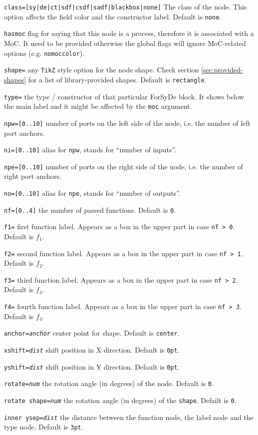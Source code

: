 \begin{optionslist}
\item \texttt{class=[sy|de|ct|sdf|csdf|sadf|blackbox|none]} The class of the node. This option affects the field color and the constructor label. Default is \texttt{none}.
\item \texttt{hasmoc} flag for saying that this node is a process, therefore it is associated with a MoC. It need to be provided otherwise the global flags will ignore MoC-related options (e.g. \texttt{nomoccolor}).
\item \texttt{shape=} any \texttt{TikZ} style option for the node shape. Check section \ref{sec:provided-shapes} for a list of library-provided shapes. Default is \texttt{rectangle}.
\item \texttt{type=} the type / constructor of that particular ForSyDe block. It shows below the main label and it might be affected by the \texttt{moc} argument.
\item \texttt{npw=[0..10]} number of ports on the left side of the node, i.e. the number of left port anchors.
\item \texttt{ni=[0..10]} alias for \texttt{npw}, stands for ``number of inputs''.
\item \texttt{npe=[0..10]} number of ports on the right side of the node, i.e. the number of right port anchors.
\item \texttt{no=[0..10]} alias for \texttt{npe}, stands for ``number of outputs''.
\item \texttt{nf=[0..4]} the number of passed functions. Default is \texttt{0}.
\item \texttt{f1=} first function label. Appears as a box in the upper part in case \texttt{nf > 0}. Default is $f_1$.
\item \texttt{f2=} second function label. Appears as a box in the upper part in case \texttt{nf > 1}. Default is $f_2$.
\item \texttt{f3=} third function label. Appears as a box in the upper part in case \texttt{nf > 2}. Default is $f_3$.
\item \texttt{f4=} fourth function label. Appears as a box in the upper part in case \texttt{nf > 3}. Default is $f_4$.
\item \texttt{anchor=\it anchor} center point for shape. Default is \texttt{center}.
\item \texttt{xshift=\it dist} shift position in X direction. Default is \texttt{0pt}.
\item \texttt{yshift=\it dist} shift position in Y direction. Default is \texttt{0pt}.
\item \texttt{rotate=\it num} the rotation angle (in degrees) of the node. Default is \texttt{0}.
\item \texttt{rotate shape=\it num} the rotation angle (in degrees) of the \texttt{shape}. Defailt is \texttt{0}.
\item \texttt{inner ysep=\it dist} the distance between the function node, the label node and the type node. Default is \texttt{3pt}.
\end{optionslist}

